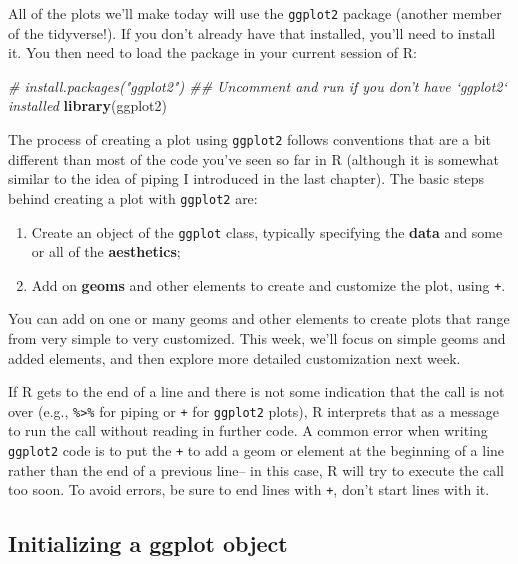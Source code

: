 \documentclass[]{book}
\makeatletter
\newenvironment{Shaded}{\begin{snugshade}}{\end{snugshade}}
\newcommand{\KeywordTok}[1]{\textcolor[rgb]{0.13,0.29,0.53}{\textbf{#1}}}
\newcommand{\CommentTok}[1]{\textcolor[rgb]{0.56,0.35,0.01}{\textit{#1}}}
\newcommand{\NormalTok}[1]{#1}
\providecommand{\tightlist}{%
  \setlength{\itemsep}{0pt}\setlength{\parskip}{0pt}}
\newenvironment{kframe}{%
\medskip{}
\setlength{\fboxsep}{.8em}
 \def\at@end@of@kframe{}%
 \ifinner\ifhmode%
  \def\at@end@of@kframe{\end{minipage}}%
  \begin{minipage}{\columnwidth}%
 \fi\fi%
 \def\FrameCommand##1{\hskip\@totalleftmargin \hskip-\fboxsep
 \colorbox{shadecolor}{##1}\hskip-\fboxsep
     \hskip-\linewidth \hskip-\@totalleftmargin \hskip\columnwidth}%
 \MakeFramed {\advance\hsize-\width
   \@totalleftmargin\z@ \linewidth\hsize
   \@setminipage}}%
 {\par\unskip\endMakeFramed%
 \at@end@of@kframe}
\renewenvironment{Shaded}{\begin{kframe}}{\end{kframe}}
\newenvironment{rmdblock}[1]
  {
  \begin{itemize}
  \renewcommand{\labelitemi}{
    \raisebox{-.7\height}[0pt][0pt]{
      {\setkeys{Gin}{width=3em,keepaspectratio}\texttt{[image: images/\#1]}}
    }
  }
  \setlength{\fboxsep}{1em}
  \begin{kframe}
  \item
  }
  {
  \end{kframe}
  \end{itemize}
  }
\newenvironment{rmdwarning}
  {\begin{rmdblock}{warning}}
  {\end{rmdblock}}
\theoremstyle{definition}
\theoremstyle{definition}
\theoremstyle{definition}
\theoremstyle{remark}
\makeatother
\begin{document}
All of the plots we'll make today will use the \texttt{ggplot2} package
(another member of the tidyverse!). If you don't already have that
installed, you'll need to install it. You then need to load the package
in your current session of R:

\begin{Shaded}
\begin{Highlighting}[]
\CommentTok{# install.packages("ggplot2")  ## Uncomment and run if you don't have `ggplot2` installed}
\KeywordTok{library}\NormalTok{(ggplot2)}
\end{Highlighting}
\end{Shaded}

The process of creating a plot using \texttt{ggplot2} follows
conventions that are a bit different than most of the code you've seen
so far in R (although it is somewhat similar to the idea of piping I
introduced in the last chapter). The basic steps behind creating a plot
with \texttt{ggplot2} are:

\begin{enumerate}
\def\labelenumi{\arabic{enumi}.}
\tightlist
\item
  Create an object of the \texttt{ggplot} class, typically specifying
  the \textbf{data} and some or all of the \textbf{aesthetics};
\item
  Add on \textbf{geoms} and other elements to create and customize the
  plot, using \texttt{+}.
\end{enumerate}

You can add on one or many geoms and other elements to create plots that
range from very simple to very customized. This week, we'll focus on
simple geoms and added elements, and then explore more detailed
customization next week.

\begin{rmdwarning}
If R gets to the end of a line and there is not some indication that the
call is not over (e.g., \texttt{\%\textgreater{}\%} for piping or
\texttt{+} for \texttt{ggplot2} plots), R interprets that as a message
to run the call without reading in further code. A common error when
writing \texttt{ggplot2} code is to put the \texttt{+} to add a geom or
element at the beginning of a line rather than the end of a previous
line-- in this case, R will try to execute the call too soon. To avoid
errors, be sure to end lines with \texttt{+}, don't start lines with it.
\end{rmdwarning}

\subsection{Initializing a ggplot
object}\label{initializing-a-ggplot-object}
\end{document}
